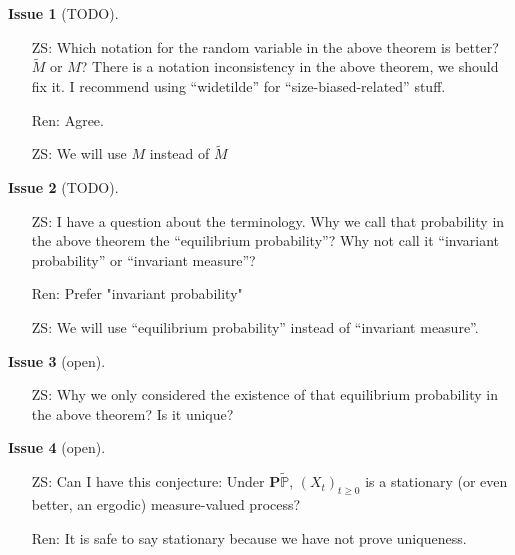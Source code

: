 \documentclass[12pt,a4paper]{amsart}
\numberwithin{equation}{section}
\theoremstyle{plain}
\theoremstyle{definition}
\newtheorem{iss}{Issue}
\begin{document}
\begin{iss}[TODO]~
  \begin{itemize}
  \item[ZS:]
    Which notation for the random variable in the above theorem is better? $\widetilde M$ or $M$? There is a notation inconsistency in the above theorem, we should fix it. I recommend using ``widetilde'' for ``size-biased-related'' stuff.
  \item[Ren:] 
Agree.
\item[ZS:]
We will use  $M$ instead of $\widetilde M$
  \end{itemize}
\end{iss}
\begin{iss}[TODO]~
  \begin{itemize}
  \item[ZS:]
I have a question about the terminology. Why we call that probability in the above theorem the ``equilibrium probability''? Why not call it ``invariant probability'' or ``invariant measure''?
\item[Ren:] Prefer "invariant probability"
\item[ZS:] We will use ``equilibrium probability'' instead of ``invariant measure''.
  \end{itemize}
\end{iss}
\begin{iss}[open]~
  \begin{itemize}
  \item[ZS:]
Why we only considered the existence of that equilibrium probability in the above theorem? Is it unique?
  \end{itemize}
\end{iss}
\begin{iss}[open]~
  \begin{itemize}
  \item[ZS:]
    Can I have this conjecture: Under $\mathbf P \widetilde{\mathbb P}$, $(X_t)_{t\geq 0}$ is a stationary (or even better, an ergodic) measure-valued process?
\item[Ren:]
  It is safe to say stationary because we have not prove uniqueness.
  \end{itemize}
\end{iss}
\end{document}
